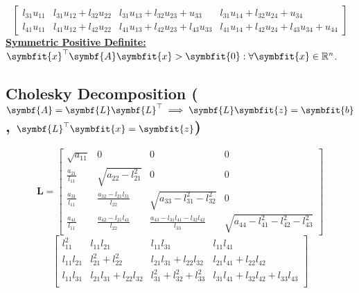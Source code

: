 \documentclass{article}
\begin{document}
\begin{minipage}[t]{126.1962963mm}
\begin{equation*}
\begin{bmatrix}
            l_{31} u_{11} & l_{31} u_{12}+l_{32} u_{22} & l_{31} u_{13}+l_{32} u_{23}+u_{33}        & l_{31} u_{14}+l_{32} u_{24}+u_{34}               \\
            l_{41} u_{11} & l_{41} u_{12}+l_{42} u_{22} & l_{41} u_{13}+l_{42} u_{23}+l_{43} u_{33} & l_{41} u_{14}+l_{42} u_{24}+l_{43} u_{34}+u_{44}
        \end{bmatrix}
    \end{equation*}
    \underline{\textbf{Symmetric Positive Definite:}} \(\symbfit{x}^\top \symbf{A} \symbfit{x} > \symbfit{0} : \forall \symbfit{x} \in \mathbb{R}^n\).
    \subsection{Cholesky Decomposition (\texorpdfstring{\(\symbf{A} = \symbf{L} \symbf{L}^\top \implies \symbf{L} \symbfit{z} = \symbfit{b}\), \(\symbf{L}^\top \symbfit{x} = \symbfit{z}\)}{A = L LT => L z = b, LT x = z})}
    \begin{equation*}
        \symbf{L} =
        \begin{bmatrix}
            \sqrt{a_{11}}         & 0                                   & 0                                                 & 0                                        \\
            \frac{a_{21}}{l_{11}} & \sqrt{a_{22}-l_{21}^2}              & 0                                                 & 0                                        \\
            \frac{a_{31}}{l_{11}} & \frac{a_{32}-l_{21} l_{31}}{l_{22}} & \sqrt{a_{33}-l_{31}^2-l_{32}^2}                   & 0                                        \\
            \frac{a_{41}}{l_{11}} & \frac{a_{42}-l_{21} l_{41}}{l_{22}} & \frac{a_{43}-l_{31} l_{41}-l_{32} l_{42}}{l_{33}} & \sqrt{a_{44}-l_{41}^2-l_{42}^2-l_{43}^2}
        \end{bmatrix}
    \end{equation*}
    \begin{equation*}
        \begin{bmatrix}
            l_{11}^2      & l_{11} l_{21}               & l_{11} l_{31}                             & l_{11} l_{41}                             \\
            l_{11} l_{21} & l_{21}^2+l_{22}^2           & l_{21} l_{31}+l_{22} l_{32}               & l_{21} l_{41}+l_{22} l_{42}               \\
            l_{11} l_{31} & l_{21} l_{31}+l_{22} l_{32} & l_{31}^2+l_{32}^2+l_{33}^2                & l_{31} l_{41}+l_{32} l_{42}+l_{33} l_{43} \\

\end{bmatrix}
\end{equation*}
\end{minipage}
\end{document}
